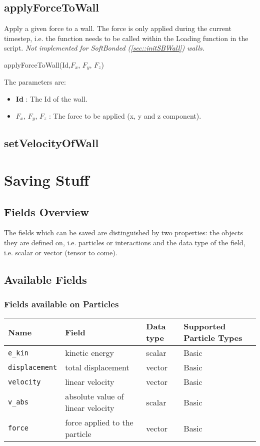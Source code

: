 \documentclass{report}
\begin{document}
\subsection{applyForceToWall}
Apply a given force to a wall. The force is only applied during the current timestep, i.e. the function needs to be called within the Loading function in the script.
\textit{Not implemented for SoftBonded (\ref{sec::initSBWall}) walls.}

\textsf{applyForceToWall(Id,$F_x$, $F_y$, $F_z$)}
\par\medskip

The parameters are:

\begin{itemize}
\item \textbf{Id} : The Id of the wall. 
\item $F_x$, $F_y$, $F_z$ : The force to be applied (x, y and z component).
\end{itemize}

\subsection{setVelocityOfWall}

\section{Saving Stuff}

\subsection{Fields Overview}

The fields which can be saved are distinguished by two properties: the objects they are defined on, i.e. particles or interactions and the data type of the field, i.e. scalar or vector (tensor to come). 

\subsection{Available Fields}
        
\subsubsection{Fields available on Particles}
\par \medskip

\begin{tabular}{|l|p{3.5cm}|l|p{2.5cm}|}
\hline
Name & Field & Data type & Supported Particle Types \\
\hline \hline
\verb{e_kin{ & kinetic energy & scalar & Basic \\
\hline
\verb{displacement{ & total displacement & vector & Basic \\
\hline
\verb{velocity{ & linear velocity & vector & Basic \\
\hline 
\verb{v_abs{ & absolute value of linear velocity & scalar & Basic \\
\hline 
\verb{force{ & force applied to the particle & vector & Basic \\
\hline
\end{tabular}
\end{document}
